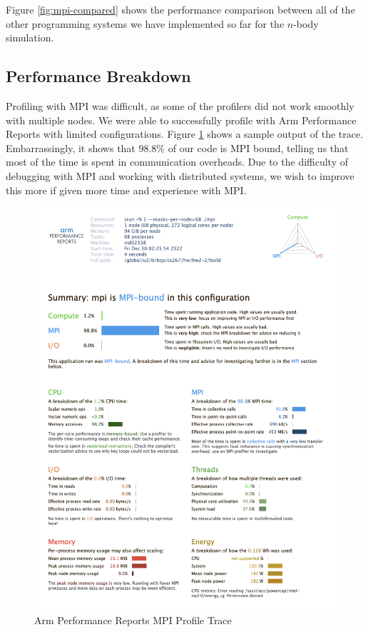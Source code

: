 \documentclass{article}
\begin{document}
Figure \ref{fig:mpi-compared} shows the performance comparison between all of the other programming systems we have implemented so far for the $n$-body simulation.

\subsection{Performance Breakdown}

Profiling with MPI was difficult, as some of the profilers did not work smoothly with multiple nodes. We were able to successfully profile with Arm Performance Reports with limited configurations. Figure \ref{fig:mpi-profile-trace} shows a sample output of the trace. Embarrassingly, it shows that 98.8\% of our code is MPI bound, telling us that most of the time is spent in communication overheads. Due to the difficulty of debugging with MPI and working with distributed systems, we wish to improve this more if given more time and experience with MPI.

\begin{figure}[H]
\centering
\includegraphics[width=6in]{figures/mpi_profile.png}
\caption{Arm Performance Reports MPI Profile Trace}
\label{fig:mpi-profile-trace}
\end{figure}
\end{document}
